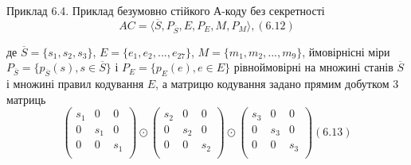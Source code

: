 \begin{example}
    Приклад 6.4. Приклад безумовно стійкого А-коду без секретності
    \begin{equation}
        AC = \langle \overline{S}, P_{\overline{S}}, E, P_E, M, P_M \rangle, (6.12)
    \end{equation}
    
    де $\overline{S} = \{s_1, s_2, s_3\}$, $E = \{e_1, e_2, ..., e_{27}\}$, $M = \{m_1, m_2, ..., m_9\}$, ймовірнісні міри
    $P_{\overline{S}} = \{p_{\overline{S}}(s), s \in \overline{S}\}$ і $P_E = \{p_E(e), e \in E\}$ рівноймовірні на множині станів $\overline{S}$ і множині
    правил кодування $E$, а матрицю кодування задано прямим добутком 3 матриць
    \begin{equation}
        \begin{pmatrix}
            s_1 & 0 & 0 \\
            0 & s_1 & 0 \\
            0 & 0 & s_1 \\
        \end{pmatrix}
        \odot \begin{pmatrix}
            s_2 & 0 & 0 \\
            0 & s_2 & 0 \\
            0 & 0 & s_2 \\
        \end{pmatrix}
        \odot \begin{pmatrix}
            s_3 & 0 & 0 \\
            0 & s_3 & 0 \\
            0 & 0 & s_3 \\
        \end{pmatrix} (6.13)
    \end{equation}
    

\end{example}
